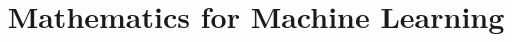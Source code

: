 \documentclass[xcolor=dvipsnames,compress,t,pdf,9pt]{beamer}
\title[\insertframenumber /\inserttotalframenumber]{Mathematics for Machine Learning}
\begin{document}
	\begin{frame}
	\titlepage
	\end{frame}
	
	
	
\end{document}
